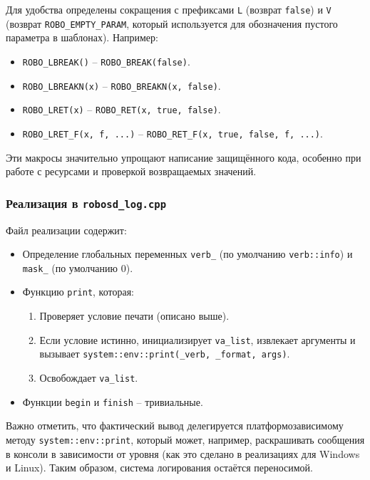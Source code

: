 \documentclass[a4paper,12pt]{article}
\begin{document}
Для удобства определены сокращения с префиксами \texttt{L} (возврат \texttt{false}) и \texttt{V} (возврат \texttt{ROBO\_EMPTY\_PARAM}, который используется для обозначения пустого параметра в шаблонах). Например:
\begin{itemize}
    \item \texttt{ROBO\_LBREAK()} -- \texttt{ROBO\_BREAK(false)}.
    \item \texttt{ROBO\_LBREAKN(x)} -- \texttt{ROBO\_BREAKN(x, false)}.
    \item \texttt{ROBO\_LRET(x)} -- \texttt{ROBO\_RET(x, true, false)}.
    \item \texttt{ROBO\_LRET\_F(x, f, ...)} -- \texttt{ROBO\_RET\_F(x, true, false, f, ...)}.
\end{itemize}

Эти макросы значительно упрощают написание защищённого кода, особенно при работе с ресурсами и проверкой возвращаемых значений.

\subsubsection{Реализация в \texttt{robosd\_log.cpp}}

Файл реализации содержит:

\begin{itemize}
    \item Определение глобальных переменных \texttt{verb\_} (по умолчанию \texttt{verb::info}) и \texttt{mask\_} (по умолчанию 0).
    \item Функцию \texttt{print}, которая:
        \begin{enumerate}
            \item Проверяет условие печати (описано выше).
            \item Если условие истинно, инициализирует \texttt{va\_list}, извлекает аргументы и вызывает \texttt{system::env::print(\_verb, \_format, args)}.
            \item Освобождает \texttt{va\_list}.
        \end{enumerate}
    \item Функции \texttt{begin} и \texttt{finish} -- тривиальные.
\end{itemize}

Важно отметить, что фактический вывод делегируется платформозависимому методу \texttt{system::env::print}, который может, например, раскрашивать сообщения в консоли в зависимости от уровня (как это сделано в реализациях для Windows и Linux). Таким образом, система логирования остаётся переносимой.
\end{document}
